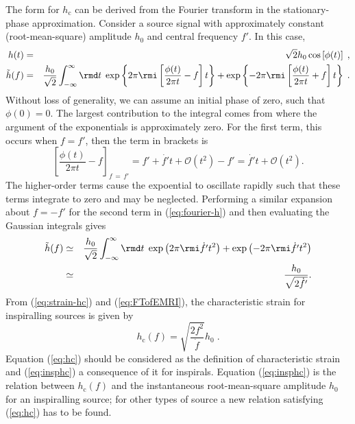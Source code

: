 The form for $h_\mathrm{c}$ can be derived from the Fourier transform in the stationary-phase approximation. Consider a source signal with approximately constant (root-mean-square) amplitude $h_0$ and central frequency $f'$. In this case,
\begin{eqnarray}
h(t) &=& \sqrt{2} h_0 \cos\left[\phi(t)\right] \; , \\
\tilde{h}(f) &=& \frac{h_0}{\sqrt{2}} \int_{-\infty}^{\infty}\rmd t\; \exp \left\{2\pi \rmi \left[\frac{\phi(t)}{2\pi t}-f\right]t\right\} + \exp \left\{-2\pi \rmi \left[\frac{\phi(t)}{2\pi t}+f\right]t\right\} \; .
\label{eq:fourier-h}
\end{eqnarray}
Without loss of generality, we can assume an initial phase of zero, such that $\phi(0) = 0$. The largest contribution to the integral comes from where the argument of the exponentials is approximately zero. For the first term, this occurs when $f = f'$, then the term in brackets is
\begin{equation}
\left[\frac{\phi(t)}{2\pi t}-f\right]_{f\,=\,f'} = f' + \dot{f'}t + \mathcal{O}\left(t^2\right) - f' = \dot{f'}t + \mathcal{O}\left(t^2\right).
\end{equation}
The higher-order terms cause the expoential to oscillate rapidly such that these terms integrate to zero and may be neglected. Performing a similar expansion about $f = -f'$ for the second term in (\ref{eq:fourier-h}) and then evaluating the Gaussian integrals gives
\begin{eqnarray} \label{eq:FTofEMRI}
\tilde{h}(f) &\simeq& \frac{h_0}{\sqrt{2}} \int_{-\infty}^{\infty}\rmd t\; \exp\left(2\pi\rmi \dot{f'} t^{2}\right) + \exp\left(-2\pi\rmi \dot{f'} t^{2}\right) \nonumber \\
&\simeq& \frac{h_0}{\sqrt{2\dot{f'}}}.
\end{eqnarray}
From (\ref{eq:strain-hc}) and (\ref{eq:FTofEMRI}), the characteristic strain for inspiralling sources is given by \citep{FinnThorne}
\begin{equation}\label{eq:insphc}
h_\mathrm{c}(f) = \sqrt{\frac{2f^{2}}{\dot{f}}}h_0 \;.
\end{equation}
Equation (\ref{eq:hc}) should be considered as the definition of characteristic strain and (\ref{eq:insphc}) a consequence of it for inspirals. Equation (\ref{eq:insphc}) is the relation between $h_\mathrm{c}(f)$ and the instantaneous root-mean-square amplitude $h_0$ for an inspiralling source; for other types of source a new relation satisfying (\ref{eq:hc}) has to be found.


